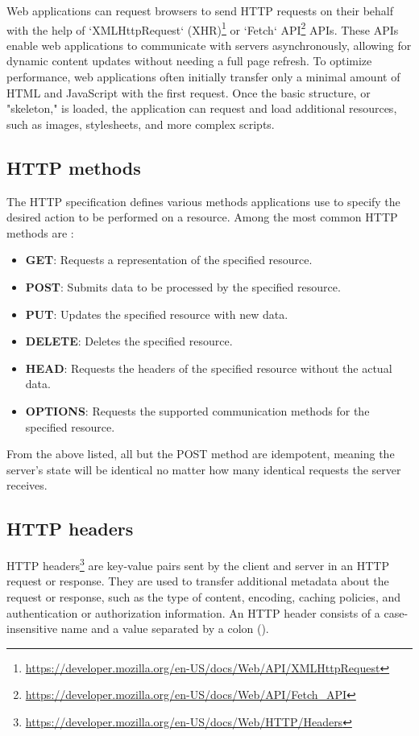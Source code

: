 Web applications can request browsers to send HTTP requests on their behalf with the help of `XMLHttpRequest` (XHR)\footnote{\url{https://developer.mozilla.org/en-US/docs/Web/API/XMLHttpRequest}} or `Fetch` API\footnote{\url{https://developer.mozilla.org/en-US/docs/Web/API/Fetch_API}} APIs. These APIs enable web applications to communicate with servers asynchronously, allowing for dynamic content updates without needing a full page refresh. To optimize performance, web applications often initially transfer only a minimal amount of HTML and JavaScript with the first request. Once the basic structure, or "skeleton," is loaded, the application can request and load additional resources, such as images, stylesheets, and more complex scripts.

\subsection{HTTP methods}

The HTTP specification \cite{RFC9110} defines various methods applications use to specify the desired action to be performed on a resource. Among the most common HTTP methods are \cite{MDN}:

\begin{itemize}
	\item \textbf{GET}: Requests a representation of the specified resource.
	\item \textbf{POST}: Submits data to be processed by the specified resource.
	\item \textbf{PUT}: Updates the specified resource with new data.
	\item \textbf{DELETE}: Deletes the specified resource.
	\item \textbf{HEAD}: Requests the headers of the specified resource without the actual data.
	\item \textbf{OPTIONS}: Requests the supported communication methods for the specified resource.
\end{itemize}

From the above listed, all but the POST method are idempotent, meaning the server's state will be identical no matter how many identical requests the server receives.

\subsection{HTTP headers}

HTTP headers\footnote{\url{https://developer.mozilla.org/en-US/docs/Web/HTTP/Headers}} are key-value pairs sent by the client and server in an HTTP request or response. They are used to transfer additional metadata about the request or response, such as the type of content, encoding, caching policies, and authentication or authorization information. An HTTP header consists of a case-insensitive name and a value separated by a colon (\uv{:}). \cite{RFC9110}

